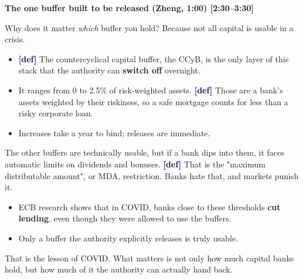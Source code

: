 {\small\textbf{The one buffer built to be released (Zheng, 1:00) [2:30–3:30]}}\par\smallskip
Why does it matter \emph{which} buffer you hold? Because not all capital is usable in a crisis.
\begin{itemize}\setlength\itemsep{0pt}
\item \textcolor{navy}{\textbf{[def]}} The countercyclical capital buffer, the CCyB, is the only layer of this stack that the authority can \textbf{switch off} overnight.
\item It ranges from 0 to 2.5\% of risk-weighted assets. \textcolor{navy}{\textbf{[def]}} Those are a bank's assets weighted by their riskiness, so a safe mortgage counts for less than a risky corporate loan.
\item Increases take a year to bind; releases are immediate.
\end{itemize}
\par\smallskip
The other buffers are technically usable, but if a bank dips into them, it faces automatic limits on dividends and bonuses. \textcolor{navy}{\textbf{[def]}} That is the "maximum distributable amount", or MDA, restriction. Banks hate that, and markets punish it.
\begin{itemize}\setlength\itemsep{0pt}
\item ECB research shows that in COVID, banks close to these thresholds \textbf{cut lending}, even though they were allowed to use the buffers.
\item Only a buffer the authority explicitly releases is truly usable.
\end{itemize}
\par\smallskip
That is the lesson of COVID. What matters is not only how much capital banks hold, but how much of it the authority can actually hand back.
